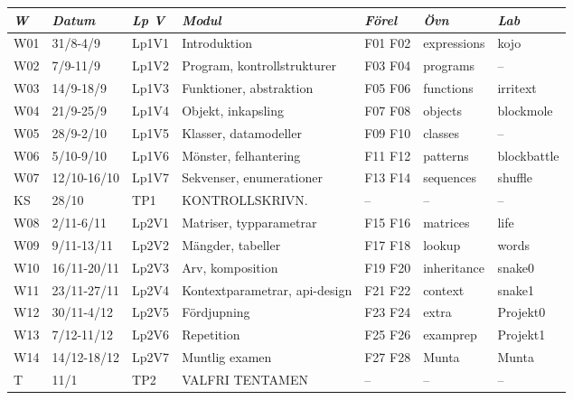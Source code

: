 \begin{tabular}{l|l|l|l|l|l|l}
\textit{W} & \textit{Datum} & \textit{Lp V} & \textit{Modul} & \textit{Förel} & \textit{Övn} & \textit{Lab} \\ \hline \hline
W01 & 31/8-4/9 & Lp1V1 & Introduktion & F01 F02 & expressions & kojo \\
W02 & 7/9-11/9 & Lp1V2 & Program, kontrollstrukturer & F03 F04 & programs & -- \\
W03 & 14/9-18/9 & Lp1V3 & Funktioner, abstraktion & F05 F06 & functions & irritext \\
W04 & 21/9-25/9 & Lp1V4 & Objekt, inkapsling & F07 F08 & objects & blockmole \\
W05 & 28/9-2/10 & Lp1V5 & Klasser, datamodeller & F09 F10 & classes & -- \\
W06 & 5/10-9/10 & Lp1V6 & Mönster, felhantering & F11 F12 & patterns & blockbattle \\
W07 & 12/10-16/10 & Lp1V7 & Sekvenser, enumerationer & F13 F14 & sequences & shuffle \\
KS & 28/10 & TP1 & KONTROLLSKRIVN. & -- & -- & -- \\
W08 & 2/11-6/11 & Lp2V1 & Matriser, typparametrar & F15 F16 & matrices & life \\
W09 & 9/11-13/11 & Lp2V2 & Mängder, tabeller & F17 F18 & lookup & words \\
W10 & 16/11-20/11 & Lp2V3 & Arv, komposition & F19 F20 & inheritance & snake0 \\
W11 & 23/11-27/11 & Lp2V4 & Kontextparametrar, api-design & F21 F22 & context & snake1 \\
W12 & 30/11-4/12 & Lp2V5 & Fördjupning & F23 F24 & extra & Projekt0 \\
W13 & 7/12-11/12 & Lp2V6 & Repetition & F25 F26 & examprep & Projekt1 \\
W14 & 14/12-18/12 & Lp2V7 & Muntlig examen & F27 F28 & Munta & Munta \\
T & 11/1 & TP2 & VALFRI TENTAMEN & -- & -- & -- \\
\end{tabular}
